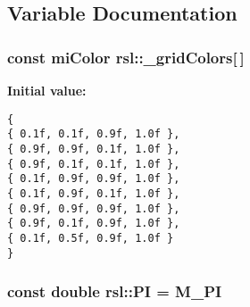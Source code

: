 \subsection{Variable Documentation}
\subsubsection{\setlength{\rightskip}{0pt plus 5cm}const mi\-Color {\bf rsl::\_\-grid\-Colors}[$\,$]\hspace{0.3cm}{\tt  [static]}}\label{namespacersl_a0}


{\bf Initial value:}

\footnotesize\begin{verbatim}
{
{ 0.1f, 0.1f, 0.9f, 1.0f },
{ 0.9f, 0.9f, 0.1f, 1.0f },
{ 0.9f, 0.1f, 0.1f, 1.0f },
{ 0.1f, 0.9f, 0.9f, 1.0f },
{ 0.1f, 0.9f, 0.1f, 1.0f },
{ 0.9f, 0.9f, 0.9f, 1.0f },
{ 0.9f, 0.1f, 0.9f, 1.0f },
{ 0.1f, 0.5f, 0.9f, 1.0f }
}
\end{verbatim}\normalsize 
{}
\subsubsection{\setlength{\rightskip}{0pt plus 5cm}const double {\bf rsl::PI} = M\_\-PI\hspace{0.3cm}{\tt  [static]}}\label{namespacersl_a1}


